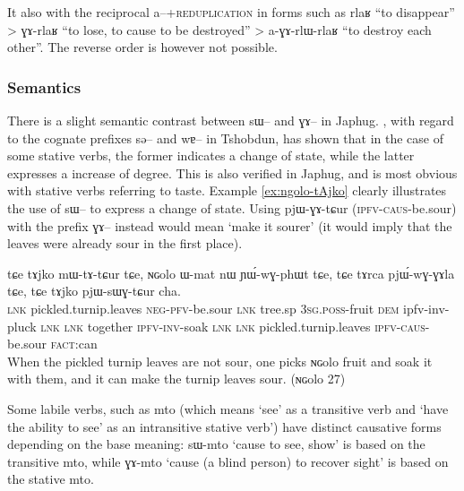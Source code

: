 \documentclass[oldfontcommands,oneside,a4paper,11pt]{article}
\newcommand{\ipa}[1]{{\phon \mbox{#1}}} %
\begin{document}
It also with the reciprocal \ipa{a}--+\textsc{reduplication} in forms such as \ipa{rlaʁ}    ``to disappear'' > \ipa{ɣɤ-rlaʁ} ``to lose, to cause to be destroyed'' > \ipa{a-ɣɤ-rlɯ-rlaʁ} ``to destroy each other''. The reverse order is however not possible.
 

\subsubsection{Semantics} \label{subsub:caus-g:semantics}
There is a slight semantic contrast between \ipa{sɯ--} and \ipa{ɣɤ--} in Japhug. \citet{jackson06paisheng, jackson13morpho}, with regard to   the cognate prefixes \ipa{sə}-- and \ipa{wɐ}--  in Tshobdun, has shown that in the case of some stative verbs, the former indicates a change of state, while the latter expresses a increase of degree. This is also verified in Japhug, and is most obvious with stative verbs referring to taste. Example \ref{ex:ngolo-tAjko} clearly illustrates the use of \ipa{sɯ--} to express a change of state. Using \ipa{pjɯ-ɣɤ-tɕur} (\textsc{ipfv-caus}-be.sour) with the prefix \ipa{ɣɤ--} instead would mean `make it sourer' (it would imply that the leaves were already sour in the first place).

 \begin{exe}
\ex \label{ex:ngolo-tAjko}
\gll
\ipa{tɕe} 	\ipa{tɤjko} 	\ipa{mɯ-tɤ-tɕur} 	\ipa{tɕe,} 	\ipa{ɴɢolo} 	\ipa{ɯ-mat} 	\ipa{nɯ} 	\ipa{ɲɯ́-wɣ-phɯt} 	\ipa{tɕe,} 	\ipa{tɕe} 	\ipa{tɤrca} 	\ipa{pjɯ́-wɣ-ɣɤla} 	\ipa{tɕe,} 	\ipa{tɕe} 	\ipa{tɤjko} 	\ipa{pjɯ-sɯɣ-tɕur} 	\ipa{cha.} \\ 
\textsc{lnk} pickled.turnip.leaves \textsc{neg-pfv}-be.sour \textsc{lnk} tree.sp \textsc{3sg.poss}-fruit \textsc{dem} ipfv-inv-pluck \textsc{lnk} \textsc{lnk} together \textsc{ipfv-inv}-soak \textsc{lnk} \textsc{lnk}  pickled.turnip.leaves \textsc{ipfv-caus}-be.sour \textsc{fact}:can \\
 \glt When the pickled turnip leaves are not sour, one picks \ipa{ɴɢolo} fruit and soak it with them, and it can make the turnip leaves sour.   (\ipa{ɴɢolo} 27)
   \end{exe}

Some labile verbs, such as \ipa{mto} (which means `see' as a transitive verb and `have the ability to see' as an intransitive stative verb') have distinct causative forms depending on the base meaning: \ipa{sɯ-mto} `cause to see, show' is based on the transitive \ipa{mto}, while \ipa{ɣɤ-mto} `cause (a blind person) to recover sight' is based on the stative \ipa{mto}.
\end{document}
